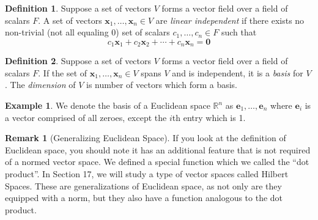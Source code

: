 \documentclass{article}
\newcommand{\R}{\mathbb{R}}
\newcommand{\x}{\mathbf{x}}
\theoremstyle{definition}
\newtheorem{definition}{Definition}[section]
\newtheorem{example}{Example}[section]
\newtheorem{remark}{Remark}[section]
\begin{document}
	\begin{definition}\label{def8.6}
		Suppose a set of vectors $ V $ forms a vector field over a field of scalars $ F $. A set of vectors $ \x_1,\ldots,\x_n\in V $ are \textit{\color{red}linear independent} if there exists no non-trivial (not all equaling $ 0 $) set of scalars $ c_1,\ldots,c_n\in F $ such that $$ c_1\x_1 + c_2\x_2 +\cdots + c_n\x_n  = \mathbf{0}$$
	\end{definition}
	\begin{definition}\label{def8.7}
		Suppose a set of vectors $ V $ forms a vector field over a field of scalars $ F $. If the set of $ \x_1,\ldots,\x_n\in V $ spans $ V $ and is independent, it is a \textit{\color{red}basis} for $ V $. The \textit{\color{red} dimension} of $ V $ is number of vectors which form a basis. 
	\end{definition}
	\begin{example}
		We denote the basis of a Euclidean space $ \R^n $ as $ {\mathbf e_1,\ldots,\mathbf e_n} $ where $ \mathbf{e}_i $ is a vector comprised of all zeroes, except the $ i $th entry which is 1. 
	\end{example}
	\begin{remark}[Generalizing Euclidean Space]
		If you look at the definition of Euclidean space, you should note it has an additional feature that is not required of a normed vector space. We defined a special function which we called the ``dot product''. In Section 17, we will study a type of vector spaces called Hilbert Spaces. These are 
		generalizations of Euclidean space, as not only are they equipped with a norm, but they also have a function analogous to the dot product. 
	\end{remark}
\end{document}
